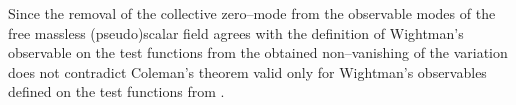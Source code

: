 \documentclass[a4paper,12pt] {article}
\begin{document}
Since the removal of the collective zero--mode from the observable
modes of the free massless (pseudo)scalar field \coordHE{} agrees
with the definition of Wightman's observable on the test functions
from \coordHE{} the obtained non--vanishing of the
variation \coordHE{} does not contradict Coleman's theorem
valid only for Wightman's observables defined on the test functions
from \coordHE{} \cite{th0204237,th0206244}.




















\newpage
\end{document}
